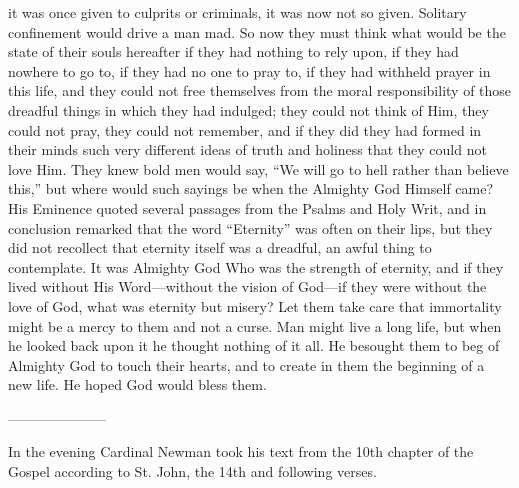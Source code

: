 it was once given to culprits or criminals, it was now not so given.
Solitary confinement would drive a man mad. So now they must think
what would be the state of their souls hereafter if they had nothing
to rely upon, if they had nowhere to go to, if they had no one to pray
to, if they had withheld prayer in this life, and they could not free
themselves from the moral responsibility of those dreadful things
in which they had indulged; they could not think of Him, they could
not pray, they could not remember, and if they did they had formed in
their minds such very different ideas of truth and holiness that they
could not love Him. They knew bold men would say, ``We will go to hell
rather than believe this,'' but where would such sayings be when the
Almighty God Himself came? His Eminence quoted several passages from
the Psalms and Holy Writ, and in conclusion remarked that the word ``Eternity''
was often on their lips, but they did not recollect that eternity
itself was a dreadful, an awful thing to contemplate. It was Almighty
God Who was the strength of eternity, and if they lived without His
Word—without the vision of God—if they were without the love of
God, what was eternity but misery? Let them take care that immortality
might be a mercy to them and not a curse. Man might live a long life,
but when he looked back upon it he thought nothing of it all. He
besought them to beg of Almighty God to touch their hearts, and to
create in them the beginning of a new life. He hoped God would bless
them.

———————

In the evening Cardinal Newman
took his text from the 10th chapter of the Gospel according to St.
John, the 14th and following verses.

